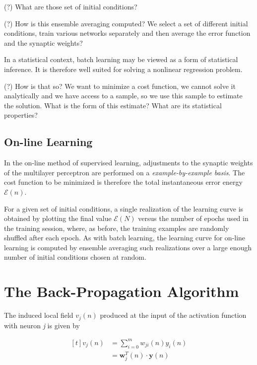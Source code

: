 \documentclass[twocolumn]{article}
\begin{document}
		\noindent (?) What are those set of initial conditions?

		\noindent (?) How is this ensemble averaging computed? We select a set of different initial conditions, train various networks separately and then average the error function and the synaptic weights?

		In a statistical context, batch learning may be viewed as a form of statistical inference. It is therefore well suited for solving a nonlinear regression problem.

		\noindent (?) How is that so? We want to minimize a cost function, we cannot solve it analytically and we have access to a sample, so we use this sample to estimate the solution. What is the form of this estimate? What are its statistical properties?

	\subsection{On-line Learning}

		In the on-line method of supervised learning, adjustments to the synaptic weights of the multilayer perceptron are performed on a \textit{example-by-example basis}. The cost function to be minimized is therefore the total instantaneous error energy $ \mathcal{E} (n) $.

		For a given set of initial conditions, a single realization of the learning curve is obtained by plotting the final value $ \mathcal{E} (N) $ versus the number of epochs used in the training session, where, as before, the training examples are randomly shuffled after each epoch. As with batch learning, the learning curve for on-line learning is computed by ensemble averaging such realizations over a large enough number of initial conditions chosen at random.

\section{The Back-Propagation Algorithm}

	The induced local field $ v_{j} (n) $ produced at the input of the activation function with neuron \textit{j} is given by

	$$ \begin{aligned}[t]
			v_{j} (n) & = \sum_{i = 0}^{m} w_{ji} (n) y_{i} (n)               \\
			          & = \boldsymbol{w}_{j}^{T} (n) \cdot \boldsymbol{y} (n) \\
		\end{aligned} $$
\end{document}
